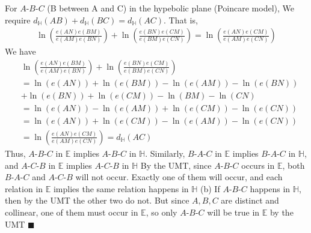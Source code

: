 \documentclass{report}
\begin{document}
    \bigbreak \noindent 
    For $A\text{-}B\text{-}C$ (B between A and C) in the hypebolic plane (Poincare model), We require $d_{\mathbb{H}}(AB) + d_{\mathbb{H}}(BC) = d_{\mathbb{H}}(AC)$. That is,
    \begin{align*}
        \ln{\left(\frac{e(AN)e(BM)}{e(AM)e(BN)}\right)} + \ln{\left(\frac{e(BN)e(CM)}{e(BM)e(CN)}\right)} = \ln{\left(\frac{e(AN)e(CM)}{e(AM)e(CN)}\right)}
    \end{align*}
    We have 
    \begin{align*}
        &\ln{\left(\frac{e(AN)e(BM)}{e(AM)e(BN)}\right)} + \ln{\left(\frac{e(BN)e(CM)}{e(BM)e(CN)}\right)} \\
        &= \ln{\left(e(AN)\right)} + \ln{\left(e(BM)\right)} - \ln{\left(e(AM)\right)} - \ln{\left(e(BN)\right)} \\
        &+ \ln{\left(e(BN)\right)} + \ln{\left(e(CM)\right)} - \ln{\left(BM\right)} - \ln{\left(CN\right)} \\
        &=\ln{\left(e(AN)\right)} - \ln{\left(e(AM)\right)} + \ln{\left(e(CM)\right)} - \ln{\left(e(CN)\right)} \\
        &=\ln{\left(e(AN)\right)}+ \ln{\left(e(CM)\right)} - \ln{\left(e(AM)\right)}  - \ln{\left(e(CN)\right)} \\
        &= \ln{\left(\frac{e(AN)e(CM)}{e(AM)e(CN)}\right)} = d_{\mathbb{H}}(AC)
    \end{align*}
    \bigbreak \noindent 
    Thus, $A\text{-}B\text{-}C$ in $\mathbb{E}$ implies $A\text{-}B\text{-}C$ in $\mathbb{H}$. Similarly, $B\text{-}A\text{-}C$ in $\mathbb{E}$ implies $B\text{-}A\text{-}C $ in $\mathbb{H} $, and $A\text{-}C\text{-}B$ in $\mathbb{E}$ implies $A\text{-}C\text{-}B $ in $\mathbb{H}$
    \bigbreak \noindent 
    By the UMT, since $A\text{-}B\text{-}C$ occurs in $\mathbb{E}$, both $B\text{-}A \text{-}C$ and $A\text{-}C\text{-}B$ will not occur. Exactly one of them will occur, and each relation in $\mathbb{E}$ implies the same relation happens in $\mathbb{H} $
    \bigbreak \noindent 
    (b) If $A\text{-}B\text{-}C$ happens in $\mathbb{H}$, then by the UMT the other two do not. But since $A,B,C$ are distinct and collinear, one of them must occur in $\mathbb{E}$, so only $A\text{-}B\text{-}C$ will be true in $\mathbb{E}$ by the UMT \hspace*{\fill} $\blacksquare $
\end{document}

